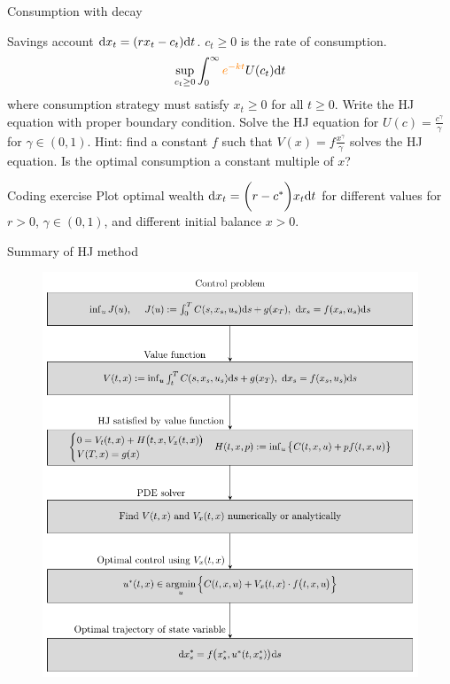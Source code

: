 \documentclass[color=usenames,dvipsnames]{beamer}
\newcommand{\dd}{\text{\normalfont d}}
\newcommand{\dt}{\text{\normalfont d}t}
\newcommand{\dx}{\text{\normalfont d}x}
\begin{document}
\begin{frame}{Consumption with decay}
    \begin{block}
        {Savings account}
        $\dd{x}_t = (rx_t - c_t)\dt$.
        $c_t\ge0$ is the rate of consumption.
        \[
        \sup_{c_t\ge0} \int_0^\infty {\color{orange}e^{-kt}}U(c_t)\dt
        \]
        where consumption strategy must satisfy $x_t\ge0$ for all $t\ge0$.
        Write the HJ equation with proper boundary condition. Solve the HJ equation for $U(c)=\frac{c^\gamma}{\gamma}$ for $\gamma\in(0,1)$. Hint: find a constant $f$ such that $V(x)=f\frac{x^\gamma}{\gamma}$ solves the HJ equation. Is the optimal consumption a constant multiple of $x$?
    \end{block}
    \begin{block}
    {Coding exercise}
        Plot optimal wealth 
        $\dx_t = \bigg(r - c^*\bigg)x_t\dt$
        for different values for $r>0$, $\gamma\in(0,1)$, and different initial balance $x>0.$
\end{block}
\end{frame}
\begin{frame}{Summary of HJ method}
    \begin{figure}
        \centering
        \includegraphics[height=0.75\textheight]{Control_lecture_notes/Figs/HJ_chart.pdf}
    \end{figure}
\end{frame}
\end{document}
